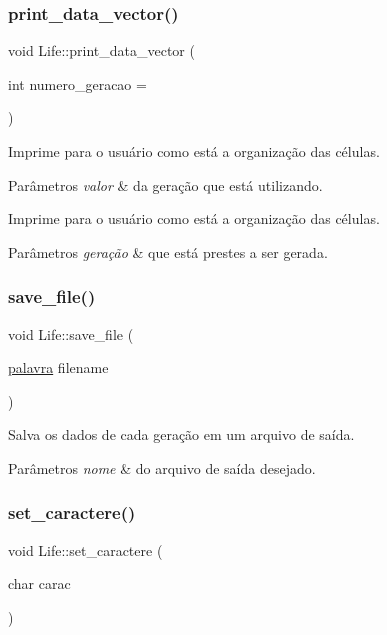 \subsubsection{\texorpdfstring{print\+\_\+data\+\_\+vector()}{print\_data\_vector()}}
{\footnotesize\ttfamily void Life\+::print\+\_\+data\+\_\+vector (\begin{DoxyParamCaption}\item[{int}]{numero\+\_\+geracao = {} }\end{DoxyParamCaption})}

Imprime para o usuário como está a organização das células. 
\begin{DoxyParams}{Parâmetros}
{\em valor} & da geração que está utilizando.\\
\hline
\end{DoxyParams}
Imprime para o usuário como está a organização das células. 
\begin{DoxyParams}{Parâmetros}
{\em geração} & que está prestes a ser gerada. \\
\hline
\end{DoxyParams}
\mbox{\label{classLife_a11daef20ad2196b79e3f944f701d8438}} 
\subsubsection{\texorpdfstring{save\+\_\+file()}{save\_file()}}
{\footnotesize\ttfamily void Life\+::save\+\_\+file (\begin{DoxyParamCaption}\item[{\hyperlink{main_8cpp_a7245fe4f29fbfabfc60878ac7b3ccc0c}{palavra}}]{filename }\end{DoxyParamCaption})}

Salva os dados de cada geração em um arquivo de saída. 
\begin{DoxyParams}{Parâmetros}
{\em nome} & do arquivo de saída desejado. \\
\hline
\end{DoxyParams}
\mbox{\label{classLife_ad24dcdaa235aca6216718cd69e346730}} 
\subsubsection{\texorpdfstring{set\+\_\+caractere()}{set\_caractere()}}
{\footnotesize\ttfamily void Life\+::set\+\_\+caractere (\begin{DoxyParamCaption}\item[{char}]{carac }\end{DoxyParamCaption})}

